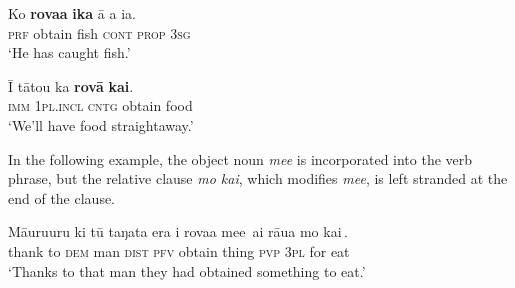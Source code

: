 \ea\label{ex:8.153}
\gll Ko \textbf{rova{\ꞌ}a} \textbf{ika} {\ꞌ}ā a ia. \\
\textsc{prf} obtain fish \textsc{cont} \textsc{prop} \textsc{3sg} \\

\glt 
‘He has caught fish.’ \textstyleExampleref{[R416.112]} 
\z

\ea\label{ex:8.154}
\gll {\ꞌ}Ī tātou ka \textbf{rovā} \textbf{kai}. \\
\textsc{imm} \textsc{1pl.incl} \textsc{cntg} obtain food \\

\glt
‘We’ll have food straightaway.’ \textstyleExampleref{[R352.067]} 
\z

In the following example, the object noun \textit{me{\ꞌ}e} is incorporated into the verb phrase, but the relative clause \textit{mo kai}, which modifies \textit{me{\ꞌ}e}, is left stranded at the end of the clause.

\ea\label{ex:8.155}
\gll Māuruuru ki tū taŋata era i rova{\ꞌ}a {\ob}me{\ꞌ}e\,{\cb} ai rāua {\ob}mo kai\,{\cb}. \\
thank to \textsc{dem} man \textsc{dist} \textsc{pfv} obtain {\db}thing \textsc{pvp} \textsc{3pl} {\db}for eat \\

\glt 
‘Thanks to that man they had obtained something to eat.’ \textstyleExampleref{[R349.021]}\textstyleExampleref{} 
\z
{}

